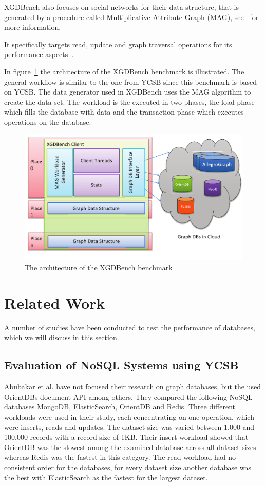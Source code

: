 XGDBench also focuses on social networks for their data structure,
that is generated by a procedure called Multiplicative Attribute Graph (MAG),
see~\cite{Kim2012} for more information.

It specifically targets read,
update and graph traversal operations for its performance aspects~\cite[366]{Dayarathna2012}.

In figure~\ref{fig:XGDBenchArchitecture} the architecture of the XGDBench benchmark is illustrated.
The general workflow is similar to the one from YCSB since this benchmark is based on YCSB.
The data generator used in XGDBench uses the MAG algorithm to create the data set.
The workload is the executed in two phases,
the load phase which fills the database with data and the transaction phase which executes operations on the database.

\begin{figure}[h!]
  \centering
  \includegraphics[width=.75\textwidth]{images/benchmarks/XGDBenchArchitecture}
  \caption{The architecture of the XGDBench benchmark~\cite[367]{Dayarathna2012}.}
  \label{fig:XGDBenchArchitecture}
\end{figure}

\section{Related Work}
A number of studies have been conducted to test the performance of databases,
which we will discuss in this section.

\subsection{Evaluation of NoSQL Systems using YCSB}
Abubakar et al. have not focused their research on graph databases,
but the used OrientDBs document API among others.
They compared the following NoSQL databases MongoDB, ElasticSearch, OrientDB and Redis.
Three different workloads were used in their study,
each concentrating on one operation,
which were inserts, reads and updates.
The dataset size was varied between 1.000 and 100.000 records with a record size of 1KB.
Their insert workload showed that OrientDB was the slowest among the examined database across all dataset sizes whereas Redis was the fastest in this category.
The read workload had no consistent order for the databases,
for every dataset size another database was the best with ElasticSearch as the fastest for the largest dataset.~\cite{Abubakar2014}

